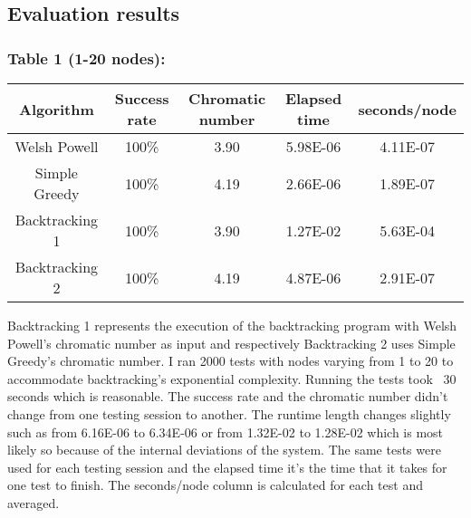 \documentclass[runningheads]{llncs}
\begin{document}
\subsection{Evaluation results}
\subsubsection{Table 1 (1-20 nodes):}
\begin{center}
	\begin{tabular}{ |c|c|c|c|c| } 
		\hline
		Algorithm & Success rate & Chromatic number & Elapsed time & seconds/node \\
		\hline
		Welsh Powell & 100\% & 3.90 & 5.98E-06 & 4.11E-07 \\
		Simple Greedy & 100\% & 4.19 & 2.66E-06 & 1.89E-07 \\
		Backtracking 1 & 100\% & 3.90 & 1.27E-02 & 5.63E-04 \\
		Backtracking 2 & 100\% & 4.19 & 4.87E-06 & 2.91E-07 \\
		\hline
	\end{tabular}
\end{center}

Backtracking 1 represents the execution of the backtracking program with Welsh Powell's
chromatic number as input and respectively Backtracking 2 uses Simple Greedy's chromatic number.
I ran 2000 tests with nodes varying from 1 to 20 to accommodate backtracking's exponential
complexity. Running the tests took ~30 seconds which is reasonable. The success rate and the
chromatic number didn't change from one testing session to another. The runtime length
changes slightly such as from 6.16E-06 to 6.34E-06 or from 1.32E-02 to 1.28E-02 which
is most likely so because of the internal deviations of the system. The same tests were
used for each testing session and the elapsed time it's the time that it takes for one
test to finish. The seconds/node column is calculated for each test and averaged.
\end{document}
